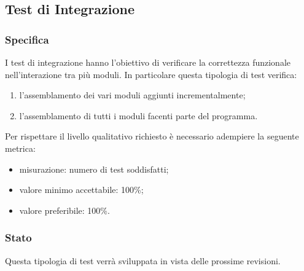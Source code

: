 \subsection{Test di Integrazione}

	\subsubsection{Specifica}
		I test di integrazione hanno l'obiettivo di verificare la correttezza funzionale nell’interazione tra più moduli. In particolare questa tipologia di test verifica:
		\begin{enumerate}
			\item{l'assemblamento dei vari moduli aggiunti incrementalmente;}
			\item{l'assemblamento di tutti i moduli facenti parte del programma.}
		\end{enumerate}
		Per rispettare il livello qualitativo richiesto è necessario adempiere la seguente metrica:
		\begin{itemize}
			\item{misurazione: numero di test soddisfatti;}
			\item{valore minimo accettabile: 100\%;}
			\item{valore preferibile: 100\%.}
		\end{itemize}
	
	
	\subsubsection{Stato}
		Questa tipologia di test verrà sviluppata in vista delle prossime revisioni.